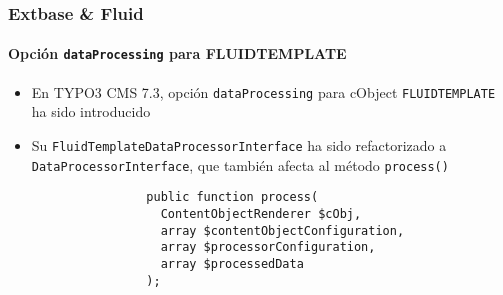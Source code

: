 \begin{frame}[fragile]
	\frametitle{Extbase \& Fluid}
	\framesubtitle{Opción \texttt{dataProcessing} para FLUIDTEMPLATE}

	\lstset{basicstyle=\tiny\ttfamily}

	\begin{itemize}

		\item En TYPO3 CMS 7.3, opción \texttt{dataProcessing} para cObject \texttt{FLUIDTEMPLATE} ha sido introducido

		\item Su \texttt{FluidTemplateDataProcessorInterface} ha sido refactorizado a \texttt{DataProcessorInterface},
			que también afecta al método \texttt{process()}

			\begin{lstlisting}
				public function process(
				  ContentObjectRenderer $cObj,
				  array $contentObjectConfiguration,
				  array $processorConfiguration,
				  array $processedData
				);
			\end{lstlisting}

	\end{itemize}

	\breakingchange

\end{frame}

